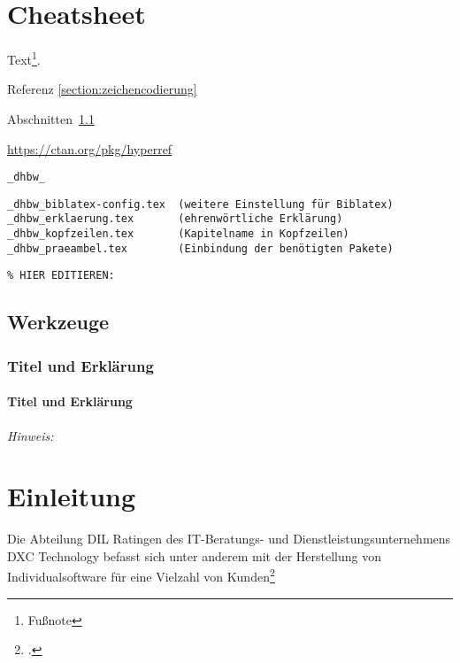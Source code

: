 \chapter{Cheatsheet}

Text\footnote{Fußnote}.

Referenz \ref{section:zeichencodierung}

Abschnitten~\ref{section:werkzeuge}

\url{https://ctan.org/pkg/hyperref}

\verb|_dhbw_|

\begin{verbatim}
_dhbw_biblatex-config.tex  (weitere Einstellung für Biblatex)
_dhbw_erklaerung.tex       (ehrenwörtliche Erklärung)
_dhbw_kopfzeilen.tex       (Kapitelname in Kopfzeilen) 
_dhbw_praeambel.tex        (Einbindung der benötigten Pakete)
\end{verbatim}

\lstset{language=TeX} 
\begin{lstlisting}
% HIER EDITIEREN: 
\end{lstlisting}

\section{Werkzeuge}\label{section:werkzeuge}

\subsection{Titel und Erklärung}

\subsubsection{Titel und Erklärung}

\emph{Hinweis:}


\chapter{Einleitung}

Die Abteilung \ac{DIL} Ratingen des IT-Beratungs- und Dienstleistungsunternehmens DXC Technology befasst sich unter anderem mit der Herstellung von Individualsoftware für eine Vielzahl von Kunden\footcite{BefragungMitarbeiternDigital2022}